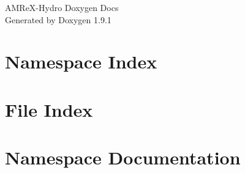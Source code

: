 \let\mypdfximage\pdfximage\def\pdfximage{\immediate\mypdfximage}\documentclass[twoside]{book}
\newcommand{\+}{\discretionary{\mbox{\scriptsize$\hookleftarrow$}}{}{}}
\newcommand{\clearemptydoublepage}{%
  \newpage{\pagestyle{empty}\cleardoublepage}%
}
\begin{document}
\raggedbottom

\hypersetup{pageanchor=false,
             bookmarksnumbered=true,
             pdfencoding=unicode
            }
\begin{titlepage}
\vspace*{7cm}
\begin{center}%
{\Large AMRe\+X-\/\+Hydro Doxygen Docs }\\
\vspace*{1cm}
{\large Generated by Doxygen 1.9.1}\\
\end{center}
\end{titlepage}
\clearemptydoublepage
{}
\tableofcontents
\clearemptydoublepage
{}
\hypersetup{pageanchor=true}

\chapter{Namespace Index}

\chapter{File Index}

\chapter{Namespace Documentation}









\end{document}
